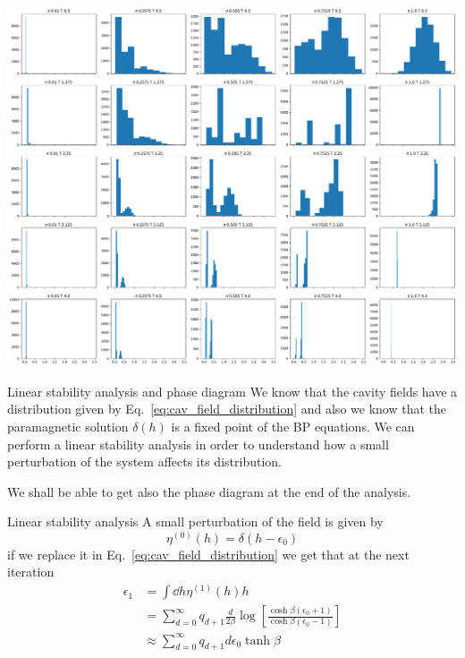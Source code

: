 \documentclass[handout]{beamer}
\begin{document}
\begin{frame}[plain]
    \centering
    \includegraphics[width=.9\textwidth]{pd_fields}
\end{frame}

\begin{frame}{Linear stability analysis and phase diagram}
    We know that the cavity fields have a distribution given by
    Eq.~\ref{eq:cav_field_distribution}
    and also we know that the paramagnetic solution $\delta(h)$ is a
    \alert{fixed point} of the BP equations. We can perform a \alert{linear
    stability analysis} in order to understand how a small perturbation of the
    system affects its distribution.

    We shall be able to get also the phase diagram at the end of the analysis.
\end{frame}

\begin{frame}{Linear stability analysis}
    A small perturbation of the field is given by
    \begin{equation}
        \eta^{(0)} (h) = \delta(h-\epsilon_0)
    \end{equation}
    if we replace it in Eq.~\ref{eq:cav_field_distribution} we get that at the
    next iteration
    \begin{align}
        \epsilon_1 &= \int \dd{h} \eta^{(1)}(h) h\\
                   &= \sum_{d=0}^{\infty} q_{d+1} \frac{d}{2\beta} \log \left[
                       \frac{\cosh{\beta(\epsilon_0+1)}}{\cosh{\beta(\epsilon_0-1)}}
                   \right]\\
                   &\approx \sum_{d=0}^{\infty} q_{d+1} d \epsilon_0
                   \tanh{\beta}
    \end{align}
\end{frame}
\end{document}

